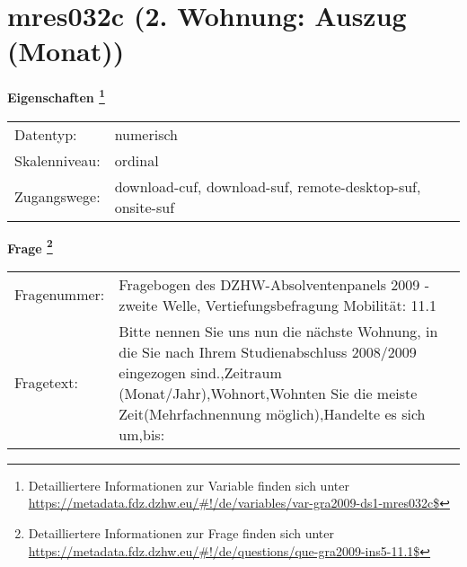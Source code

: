 
    \setcounter{footnote}{0}

    \vspace*{-1.8cm}
	\section{mres032c (2. Wohnung: Auszug (Monat))}
	\label{section:mres032c}



    \vspace*{0.5cm}
    \noindent\textbf{Eigenschaften
	\footnote{Detailliertere Informationen zur Variable finden sich unter
		\url{https://metadata.fdz.dzhw.eu/\#!/de/variables/var-gra2009-ds1-mres032c$}}}\\
	\begin{tabularx}{\hsize}{@{}lX}
	Datentyp: & numerisch \\
	Skalenniveau: & ordinal \\
	Zugangswege: &
	  download-cuf, 
	  download-suf, 
	  remote-desktop-suf, 
	  onsite-suf
 \\
    \end{tabularx}



				\vspace*{0.5cm}
                \noindent\textbf{Frage
	                \footnote{Detailliertere Informationen zur Frage finden sich unter
		              \url{https://metadata.fdz.dzhw.eu/\#!/de/questions/que-gra2009-ins5-11.1$}}}\\
				\begin{tabularx}{\hsize}{@{}lX}
					Fragenummer: &
					  Fragebogen des DZHW-Absolventenpanels 2009 - zweite Welle, Vertiefungsbefragung Mobilität:
					  11.1
 \\
					Fragetext: & Bitte nennen Sie uns nun die nächste Wohnung, in die Sie nach Ihrem Studienabschluss 2008/2009 eingezogen sind.,Zeitraum (Monat/Jahr),Wohnort,Wohnten Sie die meiste Zeit(Mehrfachnennung möglich),Handelte es sich um,bis: \\
				\end{tabularx}





